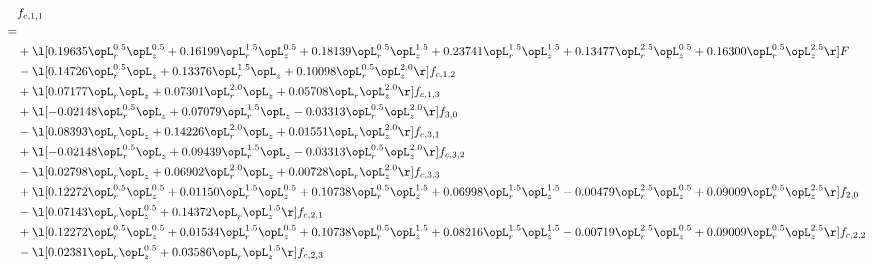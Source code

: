 \begin{alignat}{2} 
\label{eq:f_11_2} 
& f_{c,1,1} \nonumber \\ 
 = \\ 
& + \l[  0.19635 \opL_r^{0.5} \opL_z^{0.5} +  0.16199 \opL_r^{1.5} \opL_z^{0.5} +  0.18139 \opL_r^{0.5} \opL_z^{1.5} +  0.23741 \opL_r^{1.5} \opL_z^{1.5} +  0.13477 \opL_r^{2.5} \opL_z^{0.5} +  0.16300 \opL_r^{0.5} \opL_z^{2.5}  \r] F \nonumber \\ 
& - \l[  0.14726 \opL_r^{0.5} \opL_z +  0.13376 \opL_r^{1.5} \opL_z +  0.10098 \opL_r^{0.5} \opL_z^{2.0}  \r] f_{c,1,2} \nonumber \\ 
& + \l[  0.07177 \opL_r \opL_z +  0.07301 \opL_r^{2.0} \opL_z +  0.05708 \opL_r \opL_z^{2.0}  \r] f_{c,1,3} \nonumber \\ 
& + \l[  -0.02148 \opL_r^{0.5} \opL_z +  0.07079 \opL_r^{1.5} \opL_z   -0.03313 \opL_r^{0.5} \opL_z^{2.0}  \r] f_{3,0} \nonumber \\ 
& - \l[  0.08393 \opL_r \opL_z +  0.14226 \opL_r^{2.0} \opL_z +  0.01551 \opL_r \opL_z^{2.0}  \r] f_{c,3,1} \nonumber \\ 
& + \l[  -0.02148 \opL_r^{0.5} \opL_z +  0.09439 \opL_r^{1.5} \opL_z   -0.03313 \opL_r^{0.5} \opL_z^{2.0}  \r] f_{c,3,2} \nonumber \\ 
& - \l[  0.02798 \opL_r \opL_z +  0.06902 \opL_r^{2.0} \opL_z +  0.00728 \opL_r \opL_z^{2.0}  \r] f_{c,3,3} \nonumber \\ 
& + \l[  0.12272 \opL_r^{0.5} \opL_z^{0.5} +  0.01150 \opL_r^{1.5} \opL_z^{0.5} +  0.10738 \opL_r^{0.5} \opL_z^{1.5} +  0.06998 \opL_r^{1.5} \opL_z^{1.5}   -0.00479 \opL_r^{2.5} \opL_z^{0.5} +  0.09009 \opL_r^{0.5} \opL_z^{2.5}  \r] f_{2,0} \nonumber \\ 
& - \l[  0.07143 \opL_r \opL_z^{0.5} +  0.14372 \opL_r \opL_z^{1.5}  \r] f_{c,2,1} \nonumber \\ 
& + \l[  0.12272 \opL_r^{0.5} \opL_z^{0.5} +  0.01534 \opL_r^{1.5} \opL_z^{0.5} +  0.10738 \opL_r^{0.5} \opL_z^{1.5} +  0.08216 \opL_r^{1.5} \opL_z^{1.5}   -0.00719 \opL_r^{2.5} \opL_z^{0.5} +  0.09009 \opL_r^{0.5} \opL_z^{2.5}  \r] f_{c,2,2} \nonumber \\ 
& - \l[  0.02381 \opL_r \opL_z^{0.5} +  0.03586 \opL_r \opL_z^{1.5}  \r] f_{c,2,3} \nonumber \\ 
\end{alignat} 


